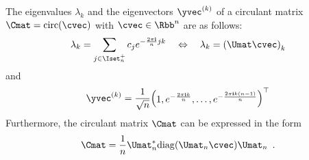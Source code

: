 \begin{theorem} \label{theorem:ch2-diagonalization_circulant_matrix}
  The eigenvalues $\lambda_k$ and the eigenvectors $\yvec^{(k)}$ of a circulant matrix $\Cmat = \circulant(\cvec)$ with $\cvec \in \Rbb^n$ are as follows:
  \begin{equation}
    \lambda_k = \sum_{j \in \Iset^+_n} c_j e^{-\frac{2 \pi \ci}{n} jk} \quad \Leftrightarrow \quad \lambda_k = \left( \Umat \cvec \right)_k
  \end{equation}
  and
  \begin{equation}
    \yvec^{(k)} = \frac{1}{\sqrt{n}} \leftmatrix 1, e^{-\frac{2 \pi \ci k}{n}}, \dots, e^{-\frac{2 \pi \ci k(n-1)}{n}} \rightmatrix^\top
  \end{equation}
  Furthermore, the circulant matrix $\Cmat$ can be expressed in the form 
  \begin{equation} \label{equation:ch2-diagonalization_circulant_matrix}
    \Cmat = \frac{1}{n} \Umat_n^* \diag(\Umat_n \cvec) \Umat_n \enspace.
  \end{equation}
\end{theorem}


\begingroup
\allowdisplaybreaks

